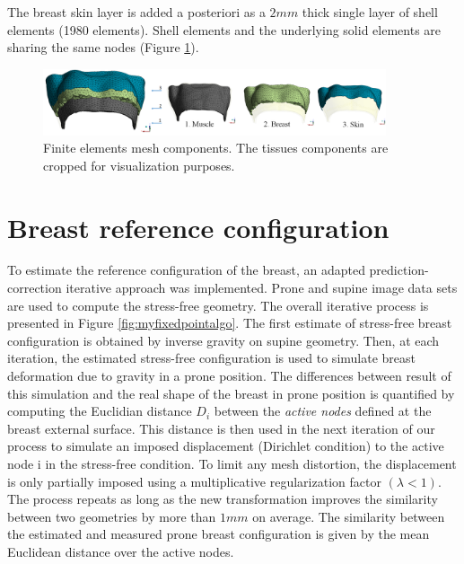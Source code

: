 The breast skin layer is added a posteriori   as a $2mm$ thick single layer of shell elements (1980 elements). Shell elements and the underlying solid elements are sharing the same nodes (Figure \ref{fig:meshcomponents}).

\begin{figure}[!h]
\centering
\includegraphics[width=0.9\textwidth,keepaspectratio]{figures/mesh3components.png} 
\caption{Finite elements mesh components. The tissues components are cropped for visualization purposes.}\label{fig:meshcomponents}
\end{figure} 

\section{Breast reference configuration}\label{section:myStressFree}
To estimate the reference configuration of the breast, an adapted prediction-correction iterative approach was implemented. Prone and supine image data sets are used to compute the stress-free geometry. The overall iterative process is presented in Figure \ref{fig:myfixedpointalgo}. The first estimate of stress-free breast configuration is obtained by inverse gravity on supine geometry. Then, at each iteration, the estimated stress-free configuration is used to simulate breast deformation due to gravity in a prone position. The differences between result of this simulation and the real shape of the breast in prone position is quantified by computing the Euclidian distance $D_i$ between the \textit{active nodes} defined at the breast external surface. This distance is then used in the next iteration of our process to simulate an imposed displacement (Dirichlet condition) to the active node i in the stress-free condition. To limit any mesh distortion, the displacement is only partially imposed using a multiplicative regularization factor $ (\lambda<1)$. The process repeats as long as the new transformation improves the similarity between two geometries by more than $1mm$ on average. The similarity between the estimated and measured prone breast configuration is given by the mean Euclidean distance over the active nodes.                                                              

